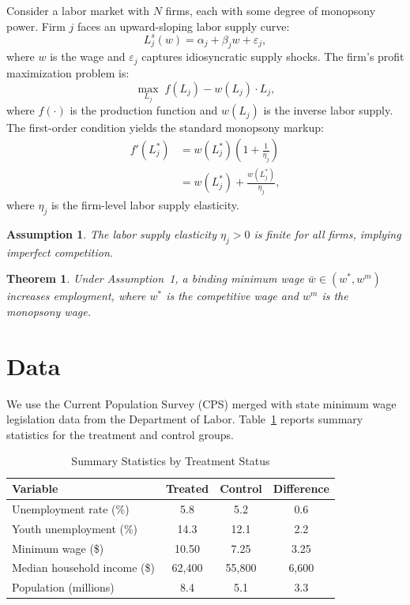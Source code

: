 \documentclass{article}
\newtheorem{theorem}{Theorem}
\newtheorem{assumption}{Assumption}
\begin{document}
Consider a labor market with $N$ firms, each with some degree of monopsony power. Firm $j$ faces an upward-sloping labor supply curve:
$$L_j^s(w) = \alpha_j + \beta_j w + \varepsilon_j,$$
where $w$ is the wage and $\varepsilon_j$ captures idiosyncratic supply shocks. The firm's profit maximization problem is:
\begin{equation}
  \max_{L_j} \; f(L_j) - w(L_j) \cdot L_j,
  \label{eq:profit}
\end{equation}
where $f(\cdot)$ is the production function and $w(L_j)$ is the inverse labor supply. The first-order condition yields the standard monopsony markup:
\begin{align}
  f'(L_j^*) &= w(L_j^*) \left(1 + \frac{1}{\eta_j}\right) \\
  &= w(L_j^*) + \frac{w(L_j^*)}{\eta_j},
\end{align}
where $\eta_j$ is the firm-level labor supply elasticity.

\begin{assumption}
The labor supply elasticity $\eta_j > 0$ is finite for all firms, implying imperfect competition.
\end{assumption}

\begin{theorem}
Under Assumption~1, a binding minimum wage $\bar{w} \in (w^*, w^m)$ increases employment, where $w^*$ is the competitive wage and $w^m$ is the monopsony wage.
\end{theorem}

\section{Data}

We use the Current Population Survey (CPS) merged with state minimum wage legislation data from the Department of Labor. Table~\ref{tab:summary} reports summary statistics for the treatment and control groups.

\begin{table}[htbp]
\centering
\caption{Summary Statistics by Treatment Status}
\label{tab:summary}
\begin{tabular}{lccc}
\hline
Variable & Treated & Control & Difference \\
\hline
Unemployment rate (\%) & 5.8 & 5.2 & 0.6 \\
Youth unemployment (\%) & 14.3 & 12.1 & 2.2 \\
Minimum wage (\$) & 10.50 & 7.25 & 3.25 \\
Median household income (\$) & 62,400 & 55,800 & 6,600 \\
Population (millions) & 8.4 & 5.1 & 3.3 \\
\hline
\end{tabular}
\end{table}
\end{document}
